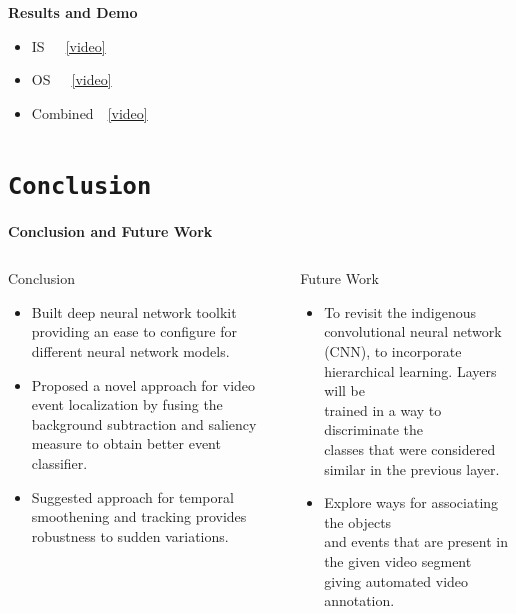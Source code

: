 \begin{frame}{\textbf{Results and Demo}}
\begin{center}
\begin{small}
\begin{multicols}{3}
\begin{itemize}
			\item IS~~~\href{run:videos/results/SI.avi}{\color{red}[video]}
			\item OS~~~\href{run:videos/results/SO.avi}{\color{red}[video]}
			\item Combined~~\href{run:videos/results/all.avi}{\color{red}[video]}
		\end{itemize}
		\end{multicols}
		\end{small}
	\end{center}
\end{frame}

\section{\texttt{Conclusion}}
\begin{frame}{\textbf{Conclusion and Future Work}}
\begin{columns}
	\begin{column}{0.48\textwidth}
		\begin{varblock}[\textwidth]{Conclusion}
		\begin{itemize}
			\item Built deep neural network toolkit providing an ease to configure for different neural network models.
			\item Proposed a novel approach for video event localization by fusing the background subtraction and saliency measure to obtain better event classifier.
			\item Suggested approach for temporal smoothening and tracking provides robustness to sudden variations.
		\end{itemize}
		\end{varblock}
	\end{column}	
	\begin{column}{0.45\textwidth}
		\begin{varblock}[\textwidth]{Future Work}
		\begin{itemize}
			\item To revisit the indigenous convolutional neural network (CNN), to incorporate hierarchical learning. Layers will be \\ trained in a way to discriminate the \\ classes that were considered similar in the previous layer.
			\item Explore ways for associating the objects \\ and events that are present
in the given video segment giving automated video annotation.
		\end{itemize}
		\end{varblock}
	\end{column}
\end{columns}
\end{frame}
